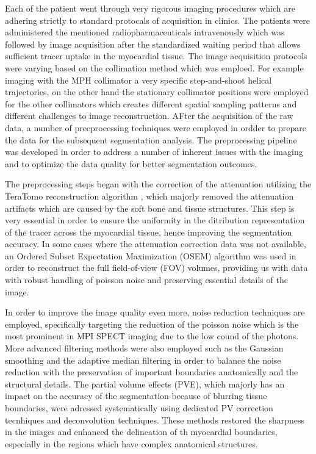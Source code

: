 Each of the patient went through very rigorous imaging procedures which are adhering strictly to standard protocals of acquisition in clinics. The patients were administered the mentioned radiopharmaceuticals intravenously which was followed by image acquisition after the standardized waiting period that allows sufficient tracer uptake in the myocardial tissue. The image acquisition protocols were varying based on the collimation method which was emploed. For example imaging with the MPH collimator a very specific step-and-shoot helical trajectories, on the other hand the stationary collimator positions were employed for the other collimators which creates different spatial sampling patterns and different challenges to image reconstruction. AFter the acquisition of the raw data, a number of precprocessing techniques were employed in ordder to prepare the data for the subsequent segmentation analysis. The preprocessing pipeline was developed in order to address a number of inherent issues with the imaging and to optimize the data quality for better segmentation outcomes.

The preprocessing steps began with the correction of the attenuation utilizing the TeraTomo reconstruction algorithm \cite{Nagy2013}, which majorly removed the attenuation artifacts which are caused by the soft bone and tissue structures. This step is very essential in order to ensure the uniformity in the ditribution representation of the tracer across the myocardial tissue, hence improving the segmentation accuracy. In some cases where the attenuation correction data was not available, an Ordered Subset Expectation Maximization (OSEM) algorithm \cite{Hudson1994} was used in order to reconstruct the full field-of-view (FOV) volumes, providing us with data with robust handling of poisson noise and preserving essential details of the image. 

In order to improve the image quality even more, noise reduction techniques are employed, specifically targeting the reduction of the poisson noise which is the most prominent in MPI SPECT imaging due to the low cound of the photons. More advanced filtering methods were also employed such as the Gaussian smoothing and the adaptive median filtering in order to balance the noise reduction with the preservation of important boundaries anatomically and the structural details. The partial volume effects (PVE), which majorly has an impact on the accuracy of the segmentation because of blurring tissue boundaries, were adressed systematically using dedicated PV correction tecnhiques and deconvolution techniques. These methods restored the sharpness in the images and enhanced the delineation of th myocardial boundaries, especially in the regions which have complex anatomical structures.

